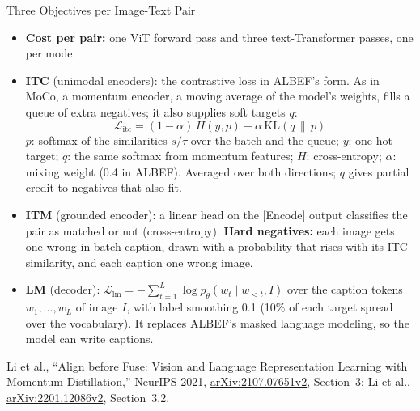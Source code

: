 \begin{frame}{Three Objectives per Image-Text Pair}
  \begin{itemize}\footnotesize\itemsep0.3em
    \item \textbf{Cost per pair:} one ViT forward pass and three text-Transformer passes, one per mode.
    \item \textbf{ITC} (unimodal encoders): the contrastive loss in ALBEF's form. As in MoCo, a momentum encoder, a moving average of the model's weights, fills a queue of extra negatives; it also supplies soft targets $q$:
    \[ \mathcal{L}_{\text{itc}} = (1-\alpha)\,H(y,p) + \alpha\,\mathrm{KL}(q\,\|\,p) \]
    $p$: softmax of the similarities $s/\tau$ over the batch and the queue; $y$: one-hot target; $q$: the same softmax from momentum features; $H$: cross-entropy; $\alpha$: mixing weight (0.4 in ALBEF). Averaged over both directions; $q$ gives partial credit to negatives that also fit.
    \item \textbf{ITM} (grounded encoder): a linear head on the [Encode] output classifies the pair as matched or not (cross-entropy). \textbf{Hard negatives:} each image gets one wrong in-batch caption, drawn with a probability that rises with its ITC similarity, and each caption one wrong image.
    \item \textbf{LM} (decoder): $\mathcal{L}_{\text{lm}} = -\sum_{t=1}^{L}\log p_\theta(w_t \mid w_{<t}, I)$ over the caption tokens $w_1,\dots,w_L$ of image $I$, with label smoothing 0.1 (10\% of each target spread over the vocabulary). It replaces ALBEF's masked language modeling, so the model can write captions.
  \end{itemize}
  \vspace{0.1em}
  {\scriptsize Li et al., ``Align before Fuse: Vision and Language Representation Learning with Momentum Distillation,'' NeurIPS 2021, \href{https://arxiv.org/abs/2107.07651v2}{arXiv:2107.07651v2}, Section~3; Li et al., \href{https://arxiv.org/abs/2201.12086v2}{arXiv:2201.12086v2}, Section~3.2.\par}
\end{frame}

